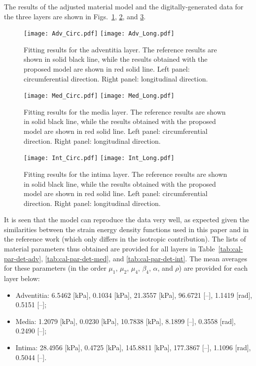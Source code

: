 The results of the adjusted material model and the digitally-generated data for the three layers are shown in Figs.~\ref{fig:det-fit-adv}, \ref{fig:det-fit-med}, and \ref{fig:det-fit-int}. 
\begin{figure}[ht!]
    \begin{center}
        \texttt{[image: Adv\_Circ.pdf]} \texttt{[image: Adv\_Long.pdf]}
    \end{center}
    \caption[Fitting results for the adventitia layer.]{Fitting results for the adventitia layer. The reference results are shown in solid black line, while the results obtained with the proposed model are shown in red solid line. Left panel: circumferential direction. Right panel: longitudinal direction.}
    \label{fig:det-fit-adv}
\end{figure}
\begin{figure}[ht!]
    \begin{center}
        \texttt{[image: Med\_Circ.pdf]} \texttt{[image: Med\_Long.pdf]}
    \end{center}
    \caption[Fitting results for the media layer.]{Fitting results for the media layer. The reference results are shown in solid black line, while the results obtained with the proposed model are shown in red solid line. Left panel: circumferential direction. Right panel: longitudinal direction.}
    \label{fig:det-fit-med}
\end{figure}
\begin{figure}[ht!]
    \begin{center}
        \texttt{[image: Int\_Circ.pdf]} \texttt{[image: Int\_Long.pdf]}
    \end{center}
    \caption[Fitting results for the intima layer.]{Fitting results for the intima layer. The reference results are shown in solid black line, while the results obtained with the proposed model are shown in red solid line. Left panel: circumferential direction. Right panel: longitudinal direction.}
    \label{fig:det-fit-int}
\end{figure}
It is seen that the model can reproduce the data very well, as expected given the similarities between the strain energy density functions used in this paper and in the reference work \cite{holzapfel2005determination} (which only differs in the isotropic contribution). The lists of material parameters thus obtained are provided for all layers in Table~\ref{tab:cal-par-det-adv}, \ref{tab:cal-par-det-med}, and \ref{tab:cal-par-det-int}. The mean averages for these parameters (in the order $\mu_1$, $\mu_2$, $\mu_4$, $\beta_4$, $\alpha$, and $\rho$) are provided for each layer below:
\begin{itemize}
    \item Adventitia: 6.5462 [kPa], 0.1034 [kPa], 21.3557 [kPa], 96.6721 [--], 1.1419 [rad], 0.5151 [--];
    \item Media: 1.2079 [kPa], 0.0230 [kPa], 10.7838 [kPa], 8.1899 [--], 0.3558 [rad], 0.2490 [--];
    \item Intima: 28.4956 [kPa], 0.4725 [kPa], 145.8811 [kPa], 177.3867 [--], 1.1096 [rad], 0.5044 [--].
\end{itemize}

